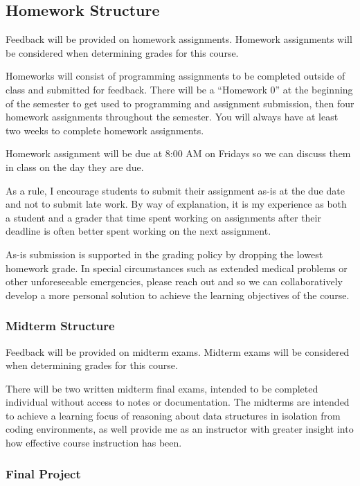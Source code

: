 \documentclass[11pt]{article}
\begin{document}
\subsection*{Homework Structure}

Feedback will be provided on homework assignments. Homework assignments will be considered when determining grades for this course.

\bigskip
\noindent Homeworks will consist of programming assignments to be completed outside of class and submitted
for feedback. There will be a ``Homework 0'' at the beginning of the semester to get used to
programming and assignment submission, then four homework assignments throughout the semester.
You will always have at least two weeks to complete homework assignments.

\bigskip
\noindent Homework assignment will be due at 8:00 AM on Fridays so we can discuss them in class on the 
day they are due.

\bigskip
\noindent As a rule, I encourage students to submit their assignment as-is at the due date and not to
submit late work. By way of explanation, it is my experience as both a student and a grader that time spent working on assignments after their deadline is often better spent working on the next assignment.

\bigskip
\noindent As-is submission is supported in the grading policy by dropping the lowest homework
grade. In special circumstances such as extended medical problems or other unforeseeable
emergencies, please reach out and so we can collaboratively develop a more personal
solution to achieve the learning objectives of the course.

\subsubsection*{Midterm Structure}

Feedback will be provided on midterm exams.  Midterm exams will be considered when determining grades for this course.

\bigskip
\noindent There will be two written midterm final exams, intended to be completed individual
without access to notes or documentation. The midterms are intended to achieve a learning
focus of reasoning about data structures in isolation from coding environments,
as well provide me as an instructor with greater insight into how effective course
instruction has been.

\subsubsection*{Final Project}
\end{document}
